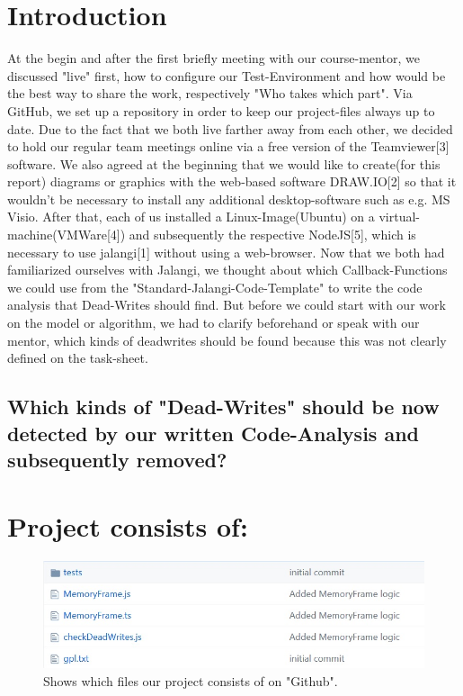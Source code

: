 \documentclass[a4paper]{scrartcl}
\begin{document}
 \section{Introduction}
At the begin and after the first briefly meeting with our course-mentor, we discussed "live" first, how to configure our Test-Environment and how would be the best way to share the work, respectively "Who takes which part". Via GitHub, we set up a repository in order to keep our project-files always up to date. Due to the fact that we both live farther away from each other, we decided to hold our regular team meetings online via a free version of the Teamviewer[3] software. We also agreed at the beginning that we would like to create(for this report) diagrams or graphics with the web-based software DRAW.IO[2] so that it wouldn't be necessary to install any additional desktop-software such as e.g. MS Visio. After that, each of us installed a Linux-Image(Ubuntu) on a virtual-machine(VMWare[4]) and subsequently
the respective NodeJS[5], which is necessary to use jalangi[1] without using a web-browser. Now that we both had familiarized ourselves with Jalangi, we thought about which Callback-Functions we could use from the "Standard-Jalangi-Code-Template" to write the code analysis that Dead-Writes should find. But before we could start with our work on the model or algorithm, we had to clarify beforehand or speak with our mentor, which kinds of deadwrites should be found because this was not clearly defined on the task-sheet.
\subsection{Which kinds of "Dead-Writes" should be now detected by our written Code-Analysis and subsequently removed?}
\newpage
\section{Project consists of:}
\begin{figure}[!htb]
	\flushleft
	\includegraphics[width=0.8\linewidth]{Github_Content.jpg}
	\caption{Shows which files our project consists of on "Github".}
	\label{img:grafik-dummy}
\end{figure}
\end{document}
